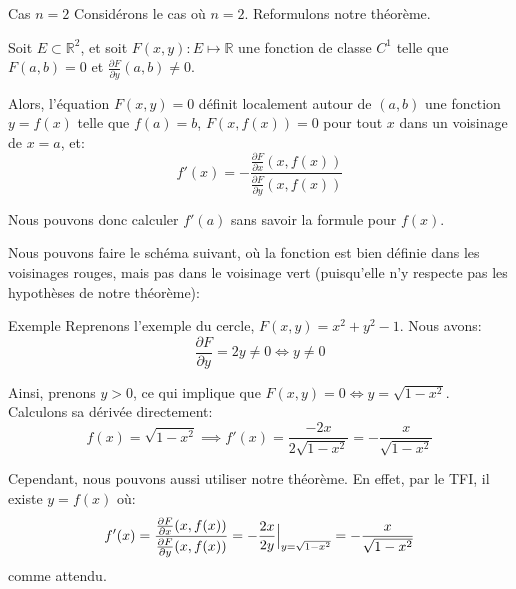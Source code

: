 \documentclass[a4paper]{article}
\begin{document}
\begin{parag}{Cas $n = 2$}
    Considérons le cas où $n = 2$. Reformulons notre théorème.

    Soit $E \subset \mathbb{R}^2$, et soit $F\left(x, y\right) : E \mapsto \mathbb{R}$ une fonction de classe $C^1$ telle que $F\left(a, b\right) = 0$ et $\frac{\partial F}{\partial y}\left(a, b\right) \neq 0$.

    Alors, l'équation $F\left(x, y\right) = 0$ définit localement autour de $\left(a, b\right)$ une fonction $y = f\left(x\right)$ telle que $f\left(a\right) = b$, $F\left(x, f\left(x\right)\right) = 0$ pour tout $x$ dans un voisinage de $x = a$, et:
    \[f'\left(x\right) = - \frac{\frac{\partial F}{\partial x}\left(x, f\left(x\right)\right)}{\frac{\partial F}{\partial y}\left(x, f\left(x\right)\right)}\]

    Nous pouvons donc calculer $f'\left(a\right)$ sans savoir la formule pour $f\left(x\right)$.

    Nous pouvons faire le schéma suivant, où la fonction est bien définie dans les voisinages rouges, mais pas dans le voisinage vert (puisqu'elle n'y respecte pas les hypothèses de notre théorème):
\end{parag}


\begin{parag}{Exemple}
    Reprenons l'exemple du cercle, $F\left(x, y\right) = x^2 + y^2 - 1$. Nous avons:
    \[\frac{\partial F}{\partial y} = 2y \neq 0 \iff y \neq 0\]

    Ainsi, prenons $y > 0$, ce qui implique que $F\left(x, y\right) = 0 \iff y = \sqrt{1 - x^2}$. Calculons sa dérivée directement:
    \[f\left(x\right) = \sqrt{1 - x^2} \implies f'\left(x\right) = \frac{-2x}{2\sqrt{1 - x^2}} = -\frac{x}{\sqrt{1 - x^2}}\]

    Cependant, nous pouvons aussi utiliser notre théorème. En effet, par le TFI, il existe $y = f\left(x\right)$ où:
    \[f'\left(x\right) = \frac{\frac{\partial F}{\partial x}\left(x, f\left(x\right)\right)}{\frac{\partial F}{\partial y}\left(x, f\left(x\right)\right)} = -\frac{2x}{2y} \eval_{y = \sqrt{1 - x^2}}^{} = -\frac{x}{\sqrt{1 - x^2}}\]
    comme attendu.
\end{parag}
\end{document}

